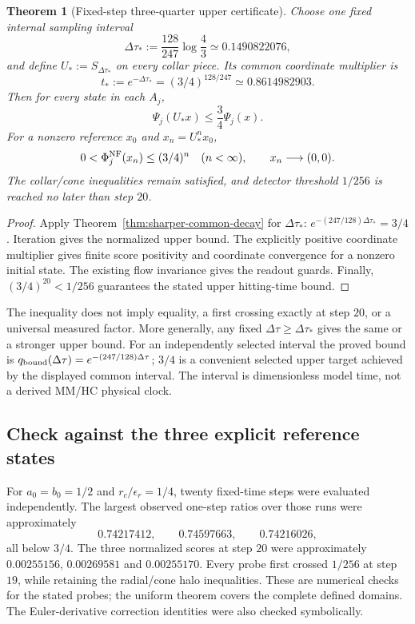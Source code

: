 \documentclass[11pt,a4paper]{article}
\newtheorem{theorem}{Theorem}
\begin{document}
\begin{theorem}[Fixed-step three-quarter upper certificate]
\label{thm:fixed-step-upper-certificate}
Choose one fixed internal sampling interval
\[
\Delta\tau_*:=\frac{128}{247}\log\frac43
\simeq0.1490822076,
\]
and define $U_*:=S_{\Delta\tau_*}$ on every collar piece. Its common
coordinate multiplier is
\[
t_*:=e^{-\Delta\tau_*}=(3/4)^{128/247}
\simeq0.8614982903.
\]
Then for every state in each $A_j$,
\[
\Psi_j(U_*x)\le\frac34\Psi_j(x).
\]
For a nonzero reference $x_0$ and $x_n=U_*^n x_0$,
\[
0<\Phi_j^{\rm NF}(x_n)\le(3/4)^n\quad(n<\infty),
\qquad x_n\longrightarrow(0,0).
\]
The collar/cone inequalities remain satisfied, and detector threshold
$1/256$ is reached no later than step $20$.
\end{theorem}
\begin{proof}
Apply Theorem~\ref{thm:sharper-common-decay} for $\Delta\tau_*$:
$e^{-(247/128)\Delta\tau_*}=3/4$. Iteration gives the normalized
upper bound. The explicitly positive coordinate multiplier gives finite
score positivity and coordinate convergence for a nonzero initial state.
The existing flow invariance gives the readout guards. Finally,
$(3/4)^{20}<1/256$ guarantees the stated upper hitting-time bound.
\end{proof}

The inequality does not imply equality, a first crossing exactly at step
$20$, or a universal measured factor. More generally, any fixed
$\Delta\tau\ge\Delta\tau_*$ gives the same or a stronger upper bound.
For an independently selected interval the proved bound is
$q_{\rm bound}(\Delta\tau)=e^{-(247/128)\Delta\tau}$; $3/4$ is a
convenient selected upper target achieved by the displayed common interval.
The interval is dimensionless model time, not a derived MM/HC physical clock.

\subsection{Check against the three explicit reference states}
For $a_0=b_0=1/2$ and $r_c/\epsilon_r=1/4$, twenty fixed-time steps
were evaluated independently. The largest observed one-step ratios over
those runs were approximately
\[
0.74217412,\qquad0.74597663,\qquad0.74216026,
\]
all below $3/4$. The three normalized scores at step $20$ were
approximately $0.00255156$, $0.00269581$ and $0.00255170$.
Every probe first crossed $1/256$ at step $19$, while retaining the
radial/cone halo inequalities. These are numerical checks for the stated
probes; the uniform theorem covers the complete defined domains.
The Euler-derivative correction identities were also checked symbolically.
\end{document}
